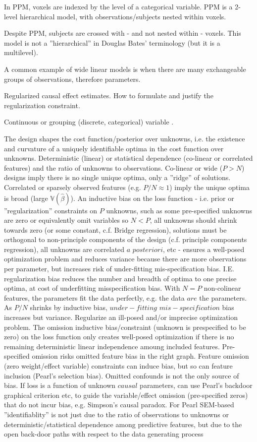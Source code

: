 \documentclass{article}
\begin{document}
In PPM, voxels are indexed by the level of a categorical variable. PPM is a 2-level hierarchical model, with observations/subjects nested within voxels.

Despite PPM, subjects are crossed with - and not nested within - voxels. This model is not a ''hierarchical'' in Douglas Bates' terminology (but it is a multilevel).


A common example of wide linear models is when there are many exchangeable groups of observations, therefore parameters.

Regularized causal effect estimates. How to formulate and justify the regularization constraint.

Continuous or grouping (discrete, categorical) variable .

The design shapes the cost function/posterior over unknowns, i.e. the existence and curvature of a uniquely identifiable optima in the cost function over unknowns. Deterministic (linear) or statistical dependence (co-linear or correlated features) and the ratio of unknowns to observations. Co-linear or wide ($P>N$) designs imply there is no single unique optima, only a ''ridge'' of solutions. Correlated or sparsely observed features (e.g. $P/N \approx 1$) imply the unique optima is broad (large $\mathbb{V}(\hat{\beta})$). An inductive bias on the loss function - i.e. prior or ''regularization'' constraints on $P$ unknowns, such as some pre-specified unknowns are zero or equivalently omit variables so $N<P$, all unknowns should shrink towards zero (or some constant, c.f. Bridge regression), solutions must be orthogonal to non-principle components of the design (c.f. principle components regression), all unknowns are correlated $a$ $posteriori$, etc - ensures a well-posed optimization problem and reduces variance because there are more observations per parameter, but increases risk of under-fitting mis-specification bias. I.E. regularization bias reduces the number and breadth of optima to one precise optima, at cost of underfitting misspecification bias. With $N=P$ non-colinear features, the parameters fit the data perfectly, e.g. the data $are$ the parameters. As $P/N$ shrinks by inductive bias, $under-fitting$ $mis-specification$ bias increases but variance. Regularize an ill-posed and/or imprecise optimization problem. The omission inductive bias/constraint (unknown is prespecified to be zero) on the loss function only creates well-posed optimization if there is no remaining deterministic linear independence amoung included features. Pre-specified omission risks omitted feature bias in the right graph. Feature omission (zero weight/effect variable) constraints can induce bias, but so can feature inclusion (Pearl's selection bias). Omitted confounds is not the only source of bias. If loss is a function of unknown $causal$ parameters, can use Pearl's backdoor graphical criterion etc, to guide the variable/effect omission (pre-specified zeros) that do not incur bias, e.g. Simpson's causal paradox. For Pearl SEM-based ''identifiablity'' is not just due to the ratio of observations to unknowns or deterministic/statistical dependence among predictive features, but due to the open back-door paths with respect to the data generating process 
\end{document}
